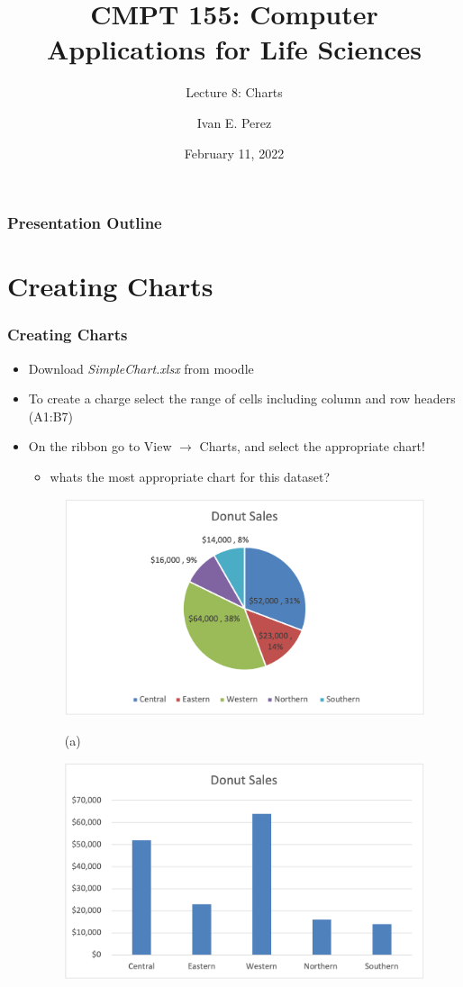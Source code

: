 \documentclass[12pt]{beamer}
\title{CMPT 155: Computer Applications for Life Sciences}
\subtitle{Lecture 8:  Charts}
\author{Ivan E. Perez}
\date{February 11, 2022}
\begin{document}
	
	\begin{frame}
		\titlepage
	\end{frame}
	
	\begin{frame}
		\frametitle{Presentation Outline}
		\tableofcontents
	\end{frame}
	\section{Creating Charts}
	\begin{frame}
		\frametitle{Creating Charts}
		\begin{itemize}
			\item Download \textit{SimpleChart.xlsx} from moodle
			\item To create a charge select the range of cells including column and row headers (A1:B7)
			\item On the ribbon go to View $\rightarrow$ Charts, and select the appropriate chart! 
			\begin{itemize}
				\item whats the most appropriate chart for this dataset?
			\end{itemize}
			\begin{figure}[htb]
			\begin{minipage}[t]{0.5\linewidth}\centering
				\includegraphics[width=0.9\linewidth]{SimpleChartPie.png}
				\medskip
				\centerline{(a)}
			\end{minipage}\hfill
			\begin{minipage}[t]{0.5\linewidth}\centering
				\includegraphics[width=0.9\linewidth]{SimpleChartBar.png}

\end{minipage}
\end{figure}
\end{itemize}
\end{frame}
\end{document}
